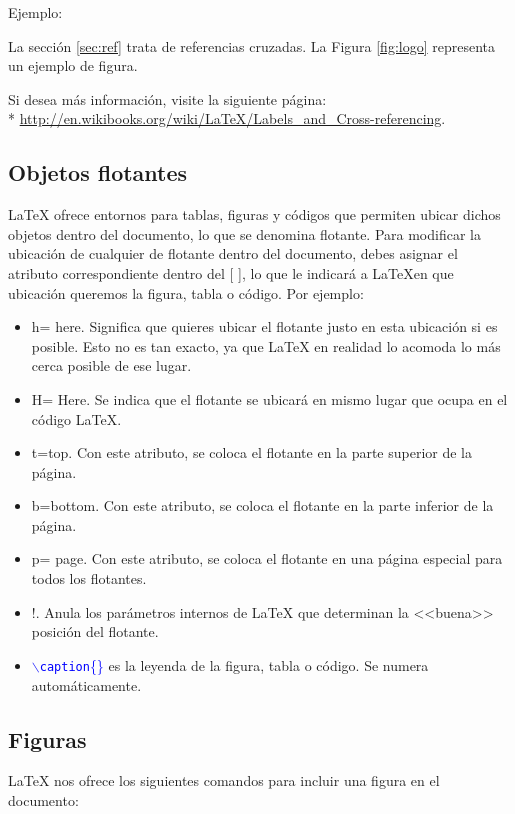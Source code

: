 Ejemplo:

La sección \ref{sec:ref} trata de referencias cruzadas. La Figura \ref{fig:logo} representa un ejemplo de figura. 

\noindent Si desea más información, visite la siguiente página:\\*
\url{http://en.wikibooks.org/wiki/LaTeX/Labels_and_Cross-referencing}.

\subsection{Objetos flotantes}

\LaTeX{} ofrece entornos para tablas, figuras y códigos que permiten ubicar dichos objetos dentro del documento, lo que se denomina flotante. Para modificar la ubicación de cualquier de flotante dentro del documento, debes asignar el atributo correspondiente dentro del [ ], lo que le indicará a \LaTeX en que ubicación queremos la figura, tabla o código. Por ejemplo:
\begin{itemize}
\item h= here. Significa que quieres ubicar el flotante justo en esta ubicación si es posible. Esto no es tan exacto, ya que \LaTeX{} en realidad lo acomoda lo más cerca posible de ese lugar.
\item H= Here. Se indica que el flotante se ubicará en mismo lugar que ocupa en el código \LaTeX{}. 
\item t=top. Con este atributo, se coloca el flotante en la parte superior de la página.
\item b=bottom. Con este atributo, se coloca el flotante en la parte inferior de la página.
\item p= page. Con este atributo, se coloca el flotante en una página especial para todos los flotantes.
\item !. Anula los parámetros internos de \LaTeX{} que determinan la <<buena>> posición del flotante.
\item \textcolor{blue}{$\backslash$\texttt{caption}\{\}} es la leyenda de la figura, tabla o código. Se numera automáticamente. 
\end{itemize}

\subsection{Figuras}

\LaTeX{} nos ofrece los siguientes comandos para incluir una figura en el documento:


